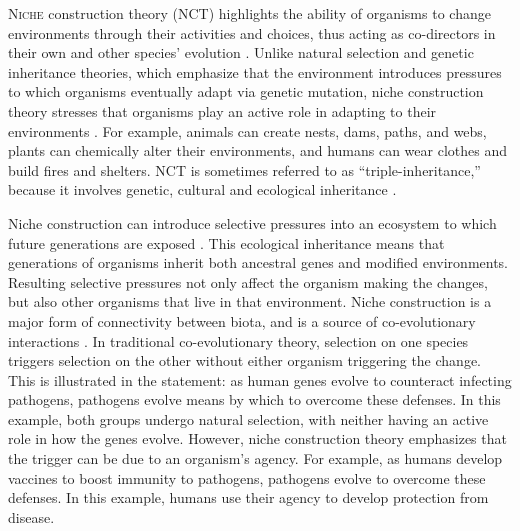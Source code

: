 	
\lettrine[nindent=0em,lines=3]{N}{iche}  construction theory (NCT) highlights the ability of organisms to change environments through their activities and choices, thus acting as co-directors in their own and other species’ evolution \parencite[2]{Odling-Smee_2003}. 
Unlike natural selection and genetic inheritance theories, which emphasize that the environment introduces pressures to which organisms eventually adapt via genetic mutation, niche construction theory stresses that organisms play an active role in adapting to their environments \parencite[304]{Laland_2010a}. 
For example, animals can create nests, dams, paths, and webs, plants can chemically alter their environments, and humans can wear clothes and build fires and shelters. NCT is sometimes referred to as “triple-inheritance,” because it involves genetic, cultural and ecological inheritance \parencites[643]{Odling-Smee_1996}[251]{Odling-Smee_2003}.

	Niche construction can introduce selective pressures into an ecosystem to which future generations are exposed \parencite[135]{Laland_2000}. 
This ecological inheritance means that generations of organisms inherit both ancestral genes and modified environments. Resulting selective pressures not only affect the organism making the changes, but also other organisms that live in that environment. Niche construction is a major form of connectivity between biota, and is a source of co-evolutionary interactions 
\parencite[201]{Odling-Smee_2003}. 
In traditional co-evolutionary theory, selection on one species triggers selection on the other without either organism triggering the change. This is illustrated in the statement: as human genes evolve to counteract infecting pathogens, pathogens evolve means by which to overcome these defenses. 
In this example, both groups undergo natural selection, with neither having an active role in how the genes evolve. However, niche construction theory emphasizes that the trigger can be due to an organism’s agency. For example, as humans develop vaccines to boost immunity to pathogens, pathogens evolve to overcome these defenses. In this example, humans use their agency to develop protection from disease. 

